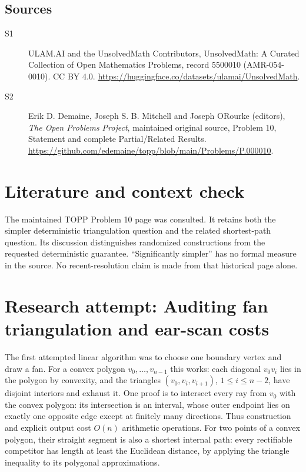 \documentclass[11pt]{article}
\begin{document}
\subsection{Sources}
\begin{description}
\item[S1] ULAM.AI and the UnsolvedMath Contributors, UnsolvedMath: A Curated Collection of Open Mathematics Problems, record 5500010 (AMR-054-0010). CC BY 4.0. \url{https://huggingface.co/datasets/ulamai/UnsolvedMath}.
\item[S2] Erik D. Demaine, Joseph S. B. Mitchell and Joseph O\textquotesingle Rourke (editors), \emph{The Open Problems Project}, maintained original source, Problem 10, Statement and complete Partial/Related Results. \url{https://github.com/edemaine/topp/blob/main/Problems/P.000010}.
\end{description}
\label{end:5500010}

\section{Literature and context check}
The maintained TOPP Problem 10 page was consulted. It retains both the
simpler deterministic triangulation question and the related shortest-path
question. Its discussion distinguishes randomized constructions from the requested
deterministic guarantee. ``Significantly simpler'' has no formal measure in the
source. No recent-resolution claim is made from that historical page alone.
\section{Research attempt: Auditing fan triangulation and ear-scan costs}
The first attempted linear algorithm was to choose one boundary vertex and
draw a fan. For a convex polygon $v_0,\ldots,v_{n-1}$ this works: each diagonal
$v_0v_i$ lies in the polygon by convexity, and the triangles
$(v_0,v_i,v_{i+1})$, $1\le i\le n-2$, have disjoint interiors and exhaust it.
One proof is to intersect every ray from $v_0$ with the convex polygon: its
intersection is an interval, whose outer endpoint lies on exactly one opposite
edge except at finitely many directions. Thus construction and explicit output
cost $O(n)$ arithmetic operations. For two points of a convex polygon, their
straight segment is also a shortest internal path: every rectifiable competitor
has length at least the Euclidean distance, by applying the triangle inequality
to its polygonal approximations.
\end{document}
